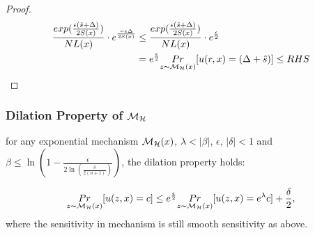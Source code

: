 \documentclass[sigconf]{acmart}
\begin{document}
\begin{proof}
\begin{equation*}
\begin{split}
\frac{exp(\frac{\epsilon (\hat{s} + \Delta)}{2 S(x)})}{NL(x)} \cdot e^{\frac{- \epsilon \Delta}{2 S(x)}}
& \leq \frac{exp(\frac{\epsilon (\hat{s} + \Delta)}{2 S(x)})}{NL(x)} \cdot e^{\frac{\epsilon}{2}}\\
&  =  e^{\frac{\epsilon}{2}} \underset{z \thicksim \mathcal{M}_{\mathcal{H}}(x)}{Pr}[u(r,x) = (\Delta + \hat{s})] \leq RHS\\
\end{split}
\end{equation*}

\end{proof}



\subsubsection{Dilation Property of $\mathcal{M}_{\mathcal{H}}$}
\begin{lem}
for any exponential mechanism $\mathcal{M}_{\mathcal{H}}(x)$, $\lambda < |\beta|$, $\epsilon$, $|\delta| < 1$ and $\beta \leq \ln(1 - \frac{\epsilon}{2 \ln (\frac{\delta}{2 (n + 1)})})$, the dilation property holds:

\begin{equation*}
\underset{z \thicksim \mathcal{M}_{\mathcal{H}}(x)}{Pr}[u(z,x) = c]
\leq
e^{\frac{\epsilon}{2}} \underset{z \thicksim \mathcal{M}_{\mathcal{H}}(x)}{Pr}[u(z,x) = e^{\lambda} c] + \frac{\delta}{2},
\end{equation*}
where the sensitivity in mechanism is still smooth sensitivity as above.
\end{lem}
\end{document}
